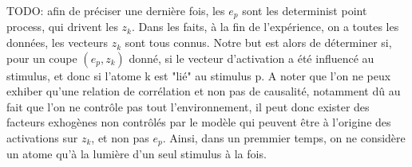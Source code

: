 TODO: afin de préciser une dernière fois, les $e_p$ sont les determinist point process, qui drivent les $z_k$.
Dans les faits, à la fin de l'expérience, on a toutes les données, les vecteurs $z_k$ sont tous connus.
Notre but est alors de déterminer si, pour un coupe $(e_p, z_k)$ donné, si le vecteur d'activation a été influencé au stimulus, et donc si l'atome k est "lié" au stimulus p.
A noter que l'on ne peux exhiber qu'une relation de corrélation et non pas de causalité, notamment dû au fait que l'on ne contrôle pas tout l'environnement, il peut donc exister des facteurs exhogènes non contrôlés par le modèle qui peuvent être à l'origine des activations sur $z_k$, et non pas $e_p$.
Ainsi, dans un premmier temps, on ne considère un atome qu'à la lumière d'un seul stimulus à la fois.